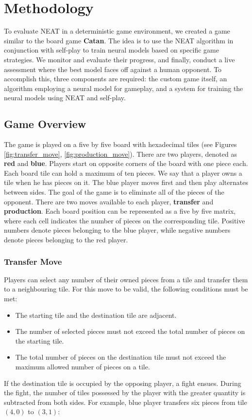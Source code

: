\documentclass[letterpaper, 12pt]{article}
\begin{document}
\section{Methodology}
To evaluate NEAT in a deterministic game environment, we created a game similar to the
board game \textbf{Catan}. The idea is to use the NEAT algorithm in conjunction with
self-play to train neural models based on specific game strategies. We monitor and
evaluate their progress, and finally, conduct a live assessment where the best model
faces off against a human opponent. To accomplish this, three components are required:
the custom game itself, an algorithm employing a neural model for gameplay, and a system
for training the neural models using NEAT and self-play.

\subsection{Game Overview}
The game is played on a five by five board with hexadecimal tiles (see Figures
\ref{fig:transfer_move}, \ref{fig:production_move}). There are two players, denoted as
\textbf{red} and \textbf{blue}. Players start on opposite corners of the board with one
piece each. Each board tile can hold a maximum of ten pieces. We say that a player owns
a tile when he has pieces on it. The blue player moves first and then play alternates
between sides. The goal of the game is to eliminate all of the pieces of the opponent.
There are two moves available to each player, \textbf{transfer} and \textbf{production}.
Each board position can be represented as a five by five matrix, where each cell
indicates the number of pieces on the corresponding tile. Positive numbers denote pieces
belonging to the blue player, while negative numbers denote pieces belonging to the red
player.

\subsubsection{Transfer Move}
Players can select any number of their owned pieces from a tile and transfer them to a 
neighbouring tile. For this move to be valid, the following conditions must be met:
\begin{itemize}
  \item The starting tile and the destination tile are adjacent.
  \item The number of selected pieces must not exceed the total number of pieces on the
    starting tile.
  \item The total number of pieces on the destination tile must not exceed the maximum 
    allowed number of pieces on a tile.
\end{itemize}
If the destination tile is occupied by the opposing player, a fight ensues. During the
fight, the number of tiles possessed by the player with the greater quantity is
subtracted from both sides. For example, blue player transfers six pieces from tile
\((4, 0)\) to \((3, 1)\):
\end{document}
